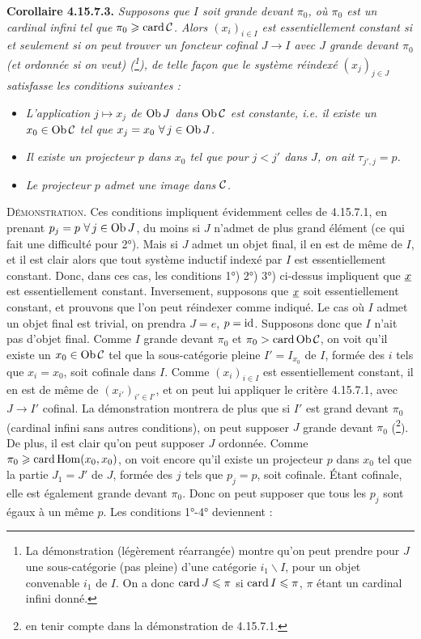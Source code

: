 \textbf{Corollaire 4.15.7.3.} \textit{Supposons que $I$ soit grande devant $\pi_0$, où $\pi_0$ est un cardinal infini tel que $\pi_0 \geqslant \operatorname{card} \mathcal{C}$. Alors $(x_i)_{i\in I}$ est essentiellement constant si et seulement si on peut trouver un foncteur cofinal $J \longrightarrow I$ avec $J$ grande devant $\pi_0$ (et ordonnée si on veut) (\footnote{La démonstration (légèrement réarrangée) montre qu'on peut prendre pour $J$ une sous-catégorie (pas pleine) d'une catégorie $i_1\backslash I$, pour un objet convenable $i_1$ de $I$. On a donc $\operatorname{card} J \leqslant \pi$ si $\operatorname{card} I \leqslant \pi$, $\pi$ étant un cardinal infini donné.}), de telle façon que le système réindexé $(x_j)_{j\in J}$ satisfasse les conditions suivantes :}
\begin{itemize}
\item[\textit{1°)}] \textit{L'application $j \longmapsto x_j$ de $\operatorname{Ob} J$ dans $\operatorname{Ob}\mathcal{C}$ est constante, i.e. il existe un $x_0 \in \operatorname{Ob}\mathcal{C}$ tel que $x_j = x_0\ \forall\, j \in \operatorname{Ob} J$.}
\item[\textit{2°)}] \textit{Il existe un projecteur $p$ dans $x_0$ tel que pour $j < j'$ dans $J$, on ait $\tau_{j',j} = p$.}
\item[\textit{3°)}] \textit{Le projecteur $p$ admet une image dans $\mathcal{C}$.}
\end{itemize}
\textsc{Démonstration}. Ces conditions impliquent évidemment celles de 4.15.7.1, en prenant $p_j = p\ \forall\, j \in \operatorname{Ob} J$, du moins si $J$ n'admet de plus grand élément (ce qui fait une difficulté pour 2°). Mais si $J$ admet un objet final, il en est de même de $I$, et il est clair alors que tout système inductif indexé par $I$ est essentiellement constant. Donc, dans ces cas, les conditions 1°) 2°) 3°) ci-dessus impliquent que $\underline{x}$ est essentiellement constant. Inversement, supposons que $\underline{x}$ soit essentiellement constant, et prouvons que l'on peut réindexer comme indiqué. Le cas où $I$ admet un objet final est trivial, on prendra $J = e$, $p = \mathrm{id}$. Supposons donc que $I$ n'ait pas d'objet final. Comme $I$ grande devant $\pi_0$ et $\pi_0 > \operatorname{card}\operatorname{Ob}\mathcal{C}$, on voit qu'il existe un $x_0 \in \operatorname{Ob}\mathcal{C}$ tel que la sous-catégorie pleine $I' = I_{x_0}$ de $I$, formée des $i$ tels que $x_i = x_0$, soit cofinale dans $I$. Comme $(x_i)_{i\in I}$ est essentiellement constant, il en est de même de $(x_{i'})_{i'\in I'}$, et on peut lui appliquer le critère 4.15.7.1, avec \marginpar{$\Vert$}%
$J \longrightarrow I'$ cofinal. La démonstration montrera de plus que si $I'$ est grand devant $\pi_0$ (cardinal infini sans autres conditions), on peut supposer $J$ grande devant $\pi_0$ (\footnote{en tenir compte dans la démonstration de 4.15.7.1.}). De plus, il est clair qu'on peut supposer $J$ ordonnée. Comme $\pi_0 \geqslant \operatorname{card}\operatorname{Hom}(x_0,x_0)$, on voit encore qu'il existe un projecteur $p$ dans $x_0$ tel que la partie $J_1 = J'$ de $J$, formée des $j$ tels que $p_j = p$, soit cofinale. Étant cofinale, elle est également grande devant $\pi_0$. Donc on peut supposer que tous les $p_j$ sont égaux à un même $p$. Les conditions 1°-4° deviennent :
